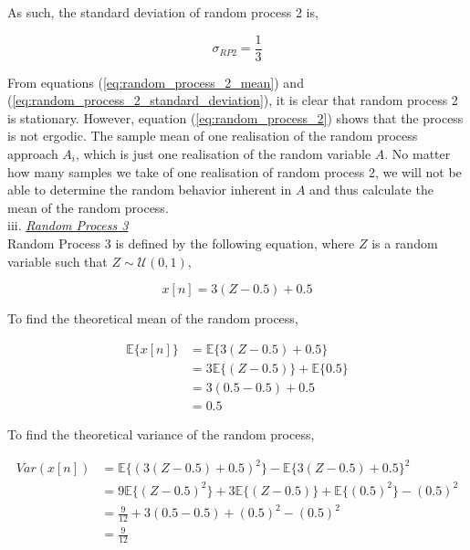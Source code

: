 \documentclass{article}
\begin{document}
As such, the standard deviation of random process 2 is,

\begin{equation}
    \sigma_{RP2} = \frac{1}{3} \label{eq:random_process_2_standard_deviation}
\end{equation}

From equations (\ref{eq:random_process_2_mean}) and (\ref{eq:random_process_2_standard_deviation}), it is clear that random process 2 is stationary. However, equation (\ref{eq:random_process_2}) shows that the process is not ergodic. The sample mean of one realisation of the random process approach $A_{i}$, which is just one realisation of the random variable $A$. No matter how many samples we take of one realisation of random process 2, we will not be able to determine the random behavior inherent in $A$ and thus calculate the mean of the random process.\\

iii. \textit{\underline{Random Process 3}}\\

Random Process 3 is defined by the following equation, where $Z$ is a random variable such that $Z \sim \mathcal{U}(0,1)$,

\begin{equation}\label{eq:random_process_3}
    x[n] = 3(Z-0.5) + 0.5
\end{equation}


To find the theoretical mean of the random process,

\begin{align}
    \mathbb{E}\{x[n]\}  &= \mathbb{E}\{3(Z-0.5) + 0.5\}\nonumber\\
                        &= 3\mathbb{E}\{(Z-0.5)\} +\mathbb{E}\{0.5\}\nonumber\\
                        &= 3(0.5-0.5) + 0.5\nonumber\\
                        &= 0.5 \label{eq:random_process_3_mean}
\end{align}

To find the theoretical variance of the random process,

\begin{align}
    Var(x[n])   &= \mathbb{E}\{(3(Z-0.5) + 0.5)^{2}\} - \mathbb{E}\{3(Z-0.5) + 0.5\}^{2}\nonumber\\
                &= 9\mathbb{E}\{(Z-0.5)^2\} +3\mathbb{E}\{(Z-0.5)\} +\mathbb{E}\{(0.5)^{2}\}- (0.5)^{2}\nonumber\\
                &= \frac{9}{12} + 3(0.5-0.5) + (0.5)^{2} - (0.5)^{2}\nonumber\\
                &= \frac{9}{12}\nonumber
\end{align}
\end{document}
